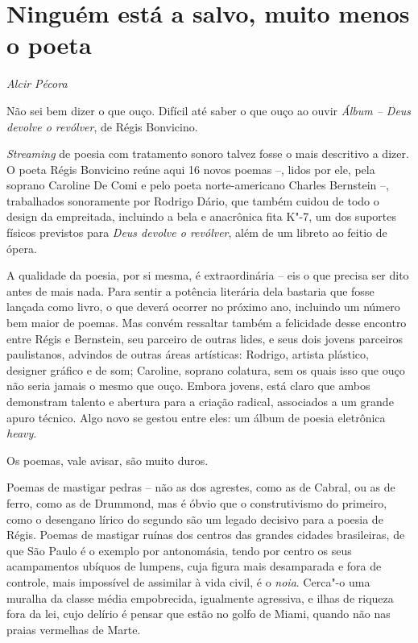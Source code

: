 \chapter*{Ninguém está a salvo, muito menos o poeta}

\begin{flushright}
\emph{Alcir Pécora}
\end{flushright}

Não sei bem dizer o que ouço. Difícil até saber o que ouço ao ouvir
\emph{Álbum -- Deus devolve o revólver}, de Régis Bonvicino.

\emph{Streaming} de poesia com tratamento sonoro talvez fosse o mais
descritivo a dizer. O poeta Régis Bonvicino reúne aqui 16 novos poemas
--, lidos por ele, pela soprano Caroline De Comi e pelo poeta
norte-americano Charles Bernstein --, trabalhados sonoramente por
Rodrigo Dário, que também cuidou de todo o design da empreitada,
incluindo a bela e anacrônica fita K"-7, um dos suportes físicos
previstos para \emph{Deus devolve o revólver}, além de um libreto ao
feitio de ópera.

A qualidade da poesia, por si mesma, é extraordinária -- eis o que
precisa ser dito antes de mais nada. Para sentir a potência literária
dela bastaria que fosse lançada como livro, o que deverá ocorrer no
próximo ano, incluindo um número bem maior de poemas. Mas convém
ressaltar também a felicidade desse encontro entre Régis e Bernstein,
seu parceiro de outras lides, e seus dois jovens parceiros paulistanos,
advindos de outras áreas artísticas: Rodrigo, artista plástico,
designer gráfico e de som; Caroline, soprano colatura, sem os quais
isso que ouço não seria jamais o mesmo que ouço. Embora jovens, está
claro que ambos demonstram talento e abertura para a criação radical,
associados a um grande apuro técnico. Algo novo se gestou entre eles: um
álbum de poesia eletrônica \emph{heavy}.

Os poemas, vale avisar, são muito duros.

Poemas de mastigar pedras -- não as dos agrestes, como as de
Cabral, ou as de ferro, como as de Drummond, mas é óbvio que o
construtivismo do primeiro, como o desengano lírico do segundo são um
legado decisivo para a poesia de Régis. Poemas de mastigar ruínas dos
centros das grandes cidades brasileiras, de que São Paulo é o exemplo
por antonomásia, tendo por centro os seus acampamentos ubíquos de
lumpens, cuja figura mais desamparada e fora de controle, mais
impossível de assimilar à vida civil, é o \emph{noia}. Cerca"-o uma
muralha da classe média empobrecida, igualmente agressiva, e ilhas de
riqueza fora da lei, cujo delírio é pensar que estão no golfo de Miami,
quando não nas praias vermelhas de Marte.

